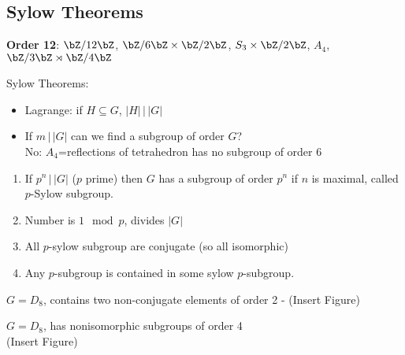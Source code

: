 
\subsection{Sylow Theorems}

\textbf{Order 12}: $\bZ/12\bZ$, $\bZ/6\bZ \times \bZ/2\bZ$, $S_3 \times \bZ/2\bZ$, $A_4$, $\bZ/3\bZ \rtimes \bZ/4\bZ$ 

\noindent
Sylow Theorems: 
\begin{itemize}
    \item Lagrange: if $H \subseteq G$, $|H| \, | \, |G|$ 
    \item If $m \, | \, |G|$ can we find a subgroup of order $G$? \\
    No: $A_4$=reflections of tetrahedron has no subgroup of order 6
\end{itemize}

\begin{theorem}
    \begin{enumerate}
        \item If $p^n \, | \, |G|$ ($p$ prime) then $G$ has a subgroup of order $p^n$ if $n$ is maximal, called $p$-Sylow subgroup. 
        \item Number is $1 \mod p$, divides $|G|$
        \item All $p$-sylow subgroup are conjugate (so all isomorphic)
        \item Any $p$-subgroup is contained in some sylow $p$-subgroup. 
    \end{enumerate}
\end{theorem}

\begin{example}
    $G=D_8$, contains two non-conjugate elements of order 2 - (Insert Figure)
\end{example}

\begin{example}
    $G=D_8$, has nonisomorphic subgroups of order 4 \\
    (Insert Figure) 
\end{example}

